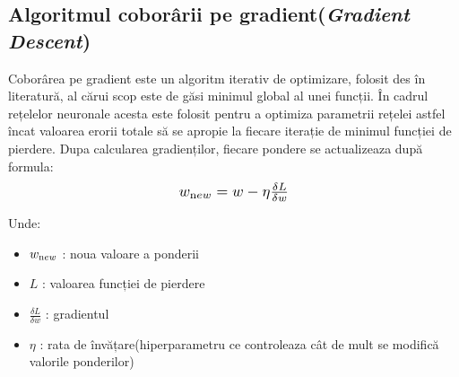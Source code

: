 \subsection{Algoritmul coborârii pe gradient(\textit{Gradient Descent})}
\label{ch:Gradient Descent}
Coborârea pe gradient este un algoritm iterativ de optimizare, folosit des în literatură, al cărui scop este de găsi minimul global al unei funcții. În cadrul rețelelor neuronale acesta este folosit pentru a optimiza parametrii rețelei astfel încat valoarea erorii totale să se apropie la fiecare iterație de minimul funcției de pierdere. Dupa calcularea gradienților, fiecare pondere se actualizeaza după formula: 
\begin{equation}
    \scalebox{1.2}{$w_{\text new} = w - \eta \frac{\delta L}{\delta w}$}
    \label{}
\end{equation}

Unde: 

\begin{itemize}
    \item $w_{\text new}$ : noua valoare a ponderii
    \item $L$ : valoarea funcției de pierdere
    \item $\frac{\delta L}{\delta w}$ : gradientul 
    \item $\eta$ : rata de învățare(hiperparametru ce controleaza cât de mult se modifică valorile ponderilor)
\end{itemize}

